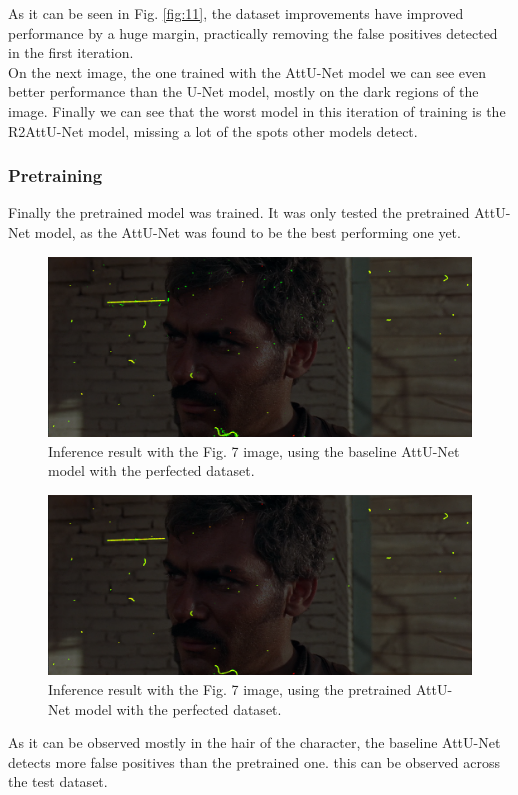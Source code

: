\documentclass[openany, 12pt]{article}
\begin{document}
As it can be seen in Fig. \ref{fig:11}, the dataset improvements have improved performance by a huge margin, practically removing the false positives detected in the first iteration. \\
On the next image, the one trained with the AttU-Net model we can see even better performance than the U-Net model, mostly on the dark regions of the image. Finally we can see that the worst model in this iteration of training is the R2AttU-Net model, missing a lot of the spots other models detect. 
\newpage
\subsubsection*{Pretraining}
Finally the pretrained model was trained. It was only tested the pretrained AttU-Net model, as the AttU-Net was found to be the best performing one yet. 
\begin{figure}[h!]
	\centering
	\includegraphics[width=0.7\linewidth]{images/punado_dollars_frame_0084-mask_pretrained_unet_40_epoch_oldloader_v1.png_comparaison.png}
	\caption{\smaller Inference result with the Fig. 7 image, using the baseline AttU-Net model with the perfected dataset.} 
	\label{fig:14}
\end{figure}
\begin{figure}[h!]
	\centering
	\includegraphics[width=0.7\linewidth]{images/punado_dollars_frame_0084-mask_big_dataset_unet_50_v1.png_comparaison.png}
	\caption{\smaller Inference result with the Fig. 7 image, using the pretrained AttU-Net model with the perfected dataset.} 
\end{figure}
As it can be observed mostly in the hair of the character, the baseline AttU-Net detects more false positives than the pretrained one. this can be observed across the test dataset. 
\end{document}
